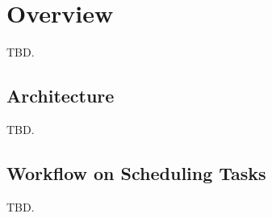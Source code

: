 \section{\xxx Overview} \label{sec:overview}

TBD. 

\subsection{Architecture} \label{sec:arch}

TBD. 

\subsection{Workflow on Scheduling Tasks} \label{sec:workflow}

TBD. 

% 

